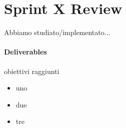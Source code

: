 \section{Sprint X Review}
Abbiamo studiato/implementato...
\paragraph{Deliverables} 
obiettivi raggiunti
\begin{itemize}
    \item uno
    \item due
    \item tre
\end{itemize}
